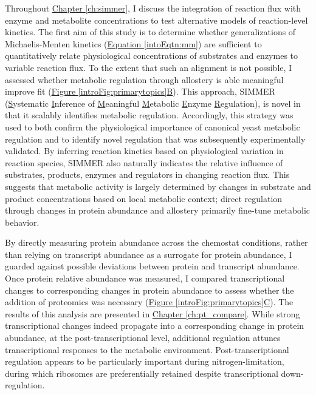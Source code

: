 Throughout \hyperref[ch:simmer]{Chapter \ref{ch:simmer}}, I discuss the integration of reaction flux with enzyme and metabolite concentrations to test alternative models of reaction-level kinetics. The first aim of this study is to determine whether generalizations of Michaelis-Menten kinetics (\hyperref[intoEqtn:mm]{Equation \ref{intoEqtn:mm}}) \cite{Liebermeister:2006fm} are sufficient to quantitatively relate physiological concentrations of substrates and enzymes to variable reaction flux.  To the extent that such an alignment is not possible, I assessed whether metabolic regulation through allostery is able meaningful improve fit (\hyperref[introFig:primarytopics]{Figure \ref{introFig:primarytopics}B}).  This approach, SIMMER (\underline{S}ystematic \underline{I}nference of \underline{M}eaningful \underline{M}etabolic \underline{E}nzyme \underline{R}egulation), is novel in that it scalably identifies metabolic regulation. Accordingly, this strategy was used to both confirm the physiological importance of canonical yeast metabolic regulation and to identify novel regulation that was subsequently experimentally validated. By inferring reaction kinetics based on physiological variation in reaction species, SIMMER also naturally indicates the relative influence of substrates, products, enzymes and regulators in changing reaction flux. This suggests that metabolic activity is largely determined by changes in substrate and product concentrations based on local metabolic context; direct regulation through changes in protein abundance and allostery primarily fine-tune metabolic behavior.

By directly measuring protein abundance across the chemostat conditions, rather than relying on transcript abundance as a surrogate for protein abundance, I guarded against possible deviations between protein and transcript abundance. Once protein relative abundance was measured, I compared transcriptional changes to corresponding changes in protein abundance to assess whether the addition of proteomics was necessary (\hyperref[introFig:primarytopics]{Figure \ref{introFig:primarytopics}C}). The results of this analysis are presented in \hyperref[ch:pt_compare]{Chapter \ref{ch:pt_compare}}.  While strong transcriptional changes  indeed propagate into a corresponding change in protein abundance, at the post-transcriptional level, additional regulation attunes transcriptional responses to the metabolic environment. Post-transcriptional regulation appears to be particularly important during nitrogen-limitation, during which ribosomes are preferentially retained despite transcriptional down-regulation.

